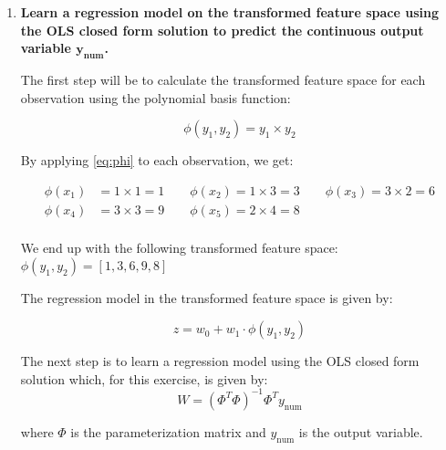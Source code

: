 \documentclass[12pt]{article}
\begin{document}
\begin{enumerate}
    \item \textbf{Learn a regression model on the transformed feature space using the OLS closed form
    solution to predict the continuous output variable $\mathbf{y_{\text{num}}}$.}
    
    \vspace{10pt}
    The first step will be to calculate the transformed feature space for each observation using the polynomial basis function:
    
    \begin{equation}\label{eq:phi}
        \phi(y_1, y_2) = y_1 \times y_2
    \end{equation}

    By applying \eqref{eq:phi} to each observation, we get:

    \begin{equation*}
        \begin{aligned}
            \phi(x_1) &= 1 \times 1 = 1 \qquad \phi(x_2) = 1 \times 3 = 3 \qquad \phi(x_3) = 3 \times 2 = 6\\
            \phi(x_4) &= 3 \times 3 = 9 \qquad \phi(x_5) = 2 \times 4 = 8 \\
        \end{aligned}
    \end{equation*}

    \vspace{10pt}
    We end up with the following transformed feature space: $\phi(y_1, y_2) = [1, 3, 6, 9, 8]$
    
    \vspace{10pt}
    The regression model in the transformed feature space is given by:
    
    \begin{equation*}
        z = w_0 + w_1 \cdot \phi(y_1, y_2)
    \end{equation*}

    \vspace{10pt}
    The next step is to learn a regression model using the OLS closed form solution which, for this exercise, is given by:
    \begin{equation*}
        W = (\Phi^T \Phi)^{-1} \Phi^T y_\text{num}
    \end{equation*}

    where $\Phi$ is the parameterization matrix and $y_\text{num}$ is the output variable. 


\end{enumerate}
\end{document}
